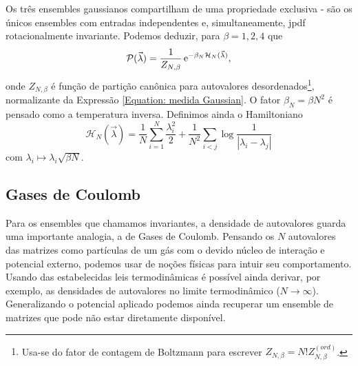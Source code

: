 \documentclass[12pt]{report}
\begin{document}
Os três ensembles gaussianos compartilham de uma propriedade exclusiva - são os únicos ensembles com entradas independentes e, simultaneamente, jpdf rotacionalmente invariante. Podemos deduzir, para $\beta = 1,2,4$ que
\begin{equation}
	\mathcal{P}(\vec{\lambda}) = \frac{1}{Z_{N, \beta}} \operatorname{\rm e}^{-\beta_N \mathcal{H}_N(\vec{\lambda})},
	\label{Equation: medida Gaussian}
\end{equation}
onde $Z_{N, \beta}$ é função de partição canônica para autovalores desordenados\footnote{Usa-se do fator de contagem de Boltzmann para escrever $ Z_{N, \beta} = N! Z_{N, \beta}^{(ord)}$.}, normalizante da Expressão \eqref{Equation: medida Gaussian}. O fator $\beta_N = \beta N^2$ é pensado como a temperatura inversa. Definimos ainda o Hamiltoniano $$\mathcal{H}_N(\vec{\lambda}) = \frac{1}{N}\sum_{i = 1}^{N} \frac{\lambda_i^2}{2} + \frac{1}{N^2} \sum_{i < j} \log{\frac{1}{|\lambda_i - \lambda_j|}}$$ com  $\lambda_i \mapsto \lambda_i \sqrt{\beta N}$.

\subsection{Gases de Coulomb}
\label{Section: Gases de Coulomb}

Para os ensembles que chamamos invariantes, a densidade de autovalores guarda uma importante analogia, a de Gases de Coulomb. Pensando os $N$ autovalores das matrizes como partículas de um gás com o devido núcleo de interação e potencial externo, podemos usar de noções físicas para intuir seu comportamento. Usando das estabelecidas leis termodinâmicas é possível ainda derivar, por exemplo, as densidades de autovalores no limite termodinâmico ($N \rightarrow \infty$). Generalizando o potencial aplicado podemos ainda recuperar um ensemble de matrizes que pode não estar diretamente disponível.

\end{document}
